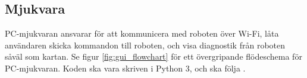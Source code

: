 \documentclass[a4paper,11pt]{article}
\begin{document}
\begin{center}
\begin{HardwareList}
\end{HardwareList}
\end{center}

\clearpage

\subsection{Mjukvara}
PC-mjukvaran ansvarar för att kommunicera med roboten över Wi-Fi, låta användaren skicka kommandon till roboten, och visa diagnostik från roboten såväl som kartan. Se figur \ref{fig:gui_flowchart} för ett övergripande flödeschema för PC-mjukvaran. Koden ska vara skriven i Python 3, och ska följa \cite{pep8}.
\end{document}
